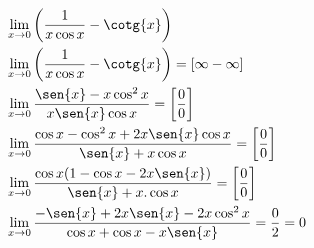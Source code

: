 \begin{ex}
\begin{align}
&\lim_{x\rightarrow 0} \left(\frac{1}{x\cos{x}}-\cotg{x}\right)\nonumber\\
&\lim_{x\rightarrow 0} \left(\frac{1}{x\cos{x}}-\cotg{x}\right)=[\infty-\infty]\nonumber\\
&\lim_{x\rightarrow 0} \frac{\sen{x}-x\cos^2{x}}{x\sen{x}\cos{x}}=\left[\frac{0}{0}\right]\nonumber\\
&\lim_{x\rightarrow 0} \frac{\cos{x}-\cos^2{x}+2x\sen{x}\cos{x}}{\sen{x}+x\cos{x}}=\left[\frac{0}{0}\right]\nonumber\\
&\lim_{x\rightarrow 0} \frac{\cos{x}(1-\cos{x}-2x\sen{x})}{\sen{x}+x.\cos{x}}=\left[\frac{0}{0}\right]\nonumber\\
&\lim_{x\rightarrow 0} \frac{-\sen{x}+2x\sen{x}-2x\cos^2{x}}{\cos{x}+\cos{x}-x\sen{x}}=\frac{0}{2}=0\nonumber
\end{align}
\end{ex}
